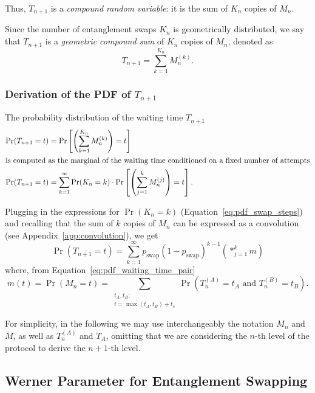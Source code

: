 \documentclass{masterthesis}
\begin{document}
Thus, $T_{n+1}$ is a \textit{compound random variable}: it is the sum of $K_n$ copies of $M_n$. 

Since the number of entanglement swaps $K_n$ is geometrically distributed, we say that $T_{n+1}$ is a \textit{geometric compound sum} of $K_n$ copies of $M_n$, denoted as
\begin{equation}
    T_{n+1}=\sum_{k=1}^{K_{n}} M_{n}^{(k)} .
\end{equation}

\subsubsection*{Derivation of the PDF of $T_{n+1}$}

The probability distribution of the waiting time $T_{n+1}$
\begin{align}
    \Pr(T_{n+1} = t) &= \Pr\left[\left(\sum_{k=1}^{K_{n}} M_{n}^{(k)}\right) = t\right] \nonumber \\
    \intertext{is computed as the marginal of the waiting time conditioned on a fixed number of attempts}
    \Pr(T_{n+1} = t) &= \sum_{k=1}^{\infty} \Pr(K_{n} = k) \cdot \Pr\left[\left( \sum_{j=1}^{k} M_{n}^{(j)} \right) = t\right].
\end{align}

Plugging in the expressions for $\Pr(K_n = k)$ (Equation~\ref{eq:pdf_swap_steps}) and recalling that the sum of $k$ copies of $M_n$ can be expressed as a convolution (see Appendix~\ref{app:convolution}), we get
\begin{equation}\label{eq:waiting_time_swap}
    \Pr(T_{n+1} = t) = \sum_{k=1}^{\infty} p_{\text{swap}}{(1 - p_{\text{swap}})}^{k-1} \left( \ast_{j=1}^{k} m \right)
\end{equation}
where, from Equation~\ref{eq:pdf_waiting_time_pair}
\begin{equation}\label{eq:pdf_waiting_time_pair_convolution}
    m(t) = \Pr(M_n = t) = \sum_{\substack{t_A, t_B: \\ t = \max(t_A, t_B) + t_c}} \Pr(T_n^{(A)} = t_A \text{ and } T_n^{(B)} = t_B) .
\end{equation}

For simplicity, in the following we may use interchangeably the notation $M_n$ and $M$, as well as $T_n^{(A)}$ and $T_A$, omitting that we are considering the $n$-th level of the protocol to derive the $n+1$-th level.

\subsection{Werner Parameter for Entanglement Swapping}
\end{document}
